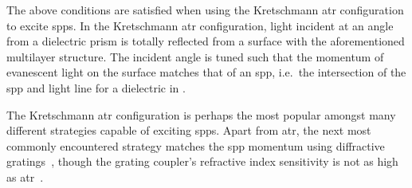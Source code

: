 The above conditions are satisfied when using the Kretschmann \gls{atr}
configuration to excite \glspl{spp}.  In the Kretschmann \gls{atr} configuration, light
incident at an angle from a dielectric prism is totally reflected from a
surface with the aforementioned multilayer structure.  The incident angle
is tuned such that the momentum of evanescent light on the surface matches
that of an \gls{spp}, i.e.\ the intersection of the \gls{spp} and light line
for a dielectric in .

The Kretschmann \gls{atr} configuration is perhaps the most popular amongst many
different strategies capable of exciting \glspl{spp}.  Apart from \gls{atr}, the next
most commonly encountered strategy matches the \gls{spp} momentum using
diffractive gratings~\cite{homola1999surface}, though the grating coupler's
refractive index sensitivity is not as high as
\gls{atr}~\cite{homola1999senscomparison}.

